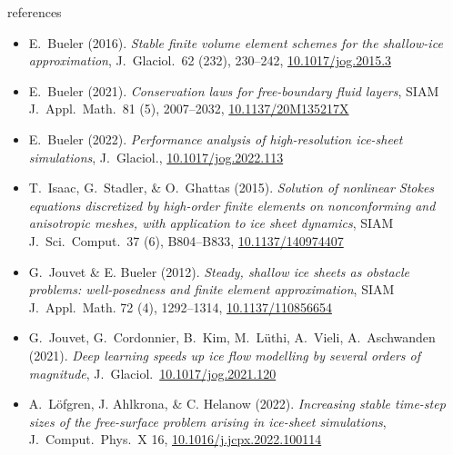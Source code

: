 \documentclass[svgnames,
               hyperref={colorlinks,citecolor=DeepPink4,linkcolor=FireBrick,urlcolor=Maroon},
               usepdftitle=false]  %
               {beamer}
\begin{document}
\begin{frame}{references}

{\scriptsize
\begin{itemize}
\item E.~Bueler (2016). \emph{Stable finite volume element schemes for the shallow-ice approximation}, J.~Glaciol.~62 (232), 230--242, \href{https://doi.org/10.1017/jog.2015.3}{10.1017/jog.2015.3}
\item E.~Bueler (2021). \emph{Conservation laws for free-boundary fluid layers}, SIAM J.~Appl.~Math.~81 (5), 2007--2032, \href{https://doi.org/10.1137/20M135217X}{10.1137/20M135217X}
\item E.~Bueler (2022). \emph{Performance analysis of high-resolution ice-sheet simulations}, J.~Glaciol., \href{https://doi.org/10.1017/jog.2022.113}{10.1017/jog.2022.113}
\item T.~Isaac, G.~Stadler, \& O.~Ghattas (2015). \emph{Solution of nonlinear Stokes equations discretized by high-order finite elements on nonconforming and anisotropic meshes, with application to ice sheet dynamics}, SIAM J.~Sci.~Comput.~37 (6), B804--B833, \href{https://doi.org/10.1137/140974407}{10.1137/140974407}
\item G.~Jouvet \& E. Bueler (2012). \emph{Steady, shallow ice sheets as obstacle problems: well-posedness and finite element approximation}, SIAM J.~Appl.~Math. 72 (4), 1292--1314, \href{https://doi.org/10.1137/110856654}{10.1137/110856654}
\item G.~Jouvet, G.~Cordonnier, B.~Kim, M.~L\"uthi, A.~Vieli, A.~Aschwanden (2021). \emph{Deep learning speeds up ice flow modelling by several orders of magnitude}, J.~Glaciol.~\href{https://doi.org/10.1017/jog.2021.120}{10.1017/jog.2021.120}
\item A.~L{\"o}fgren, J. Ahlkrona, \& C. Helanow (2022). \emph{Increasing stable time-step sizes of the free-surface problem arising in ice-sheet simulations}, J.~Comput.~Phys.~X 16, \href{https://doi.org/10.1016/j.jcpx.2022.100114}{10.1016/j.jcpx.2022.100114}
\end{itemize}
}
\end{frame}
\end{document}
